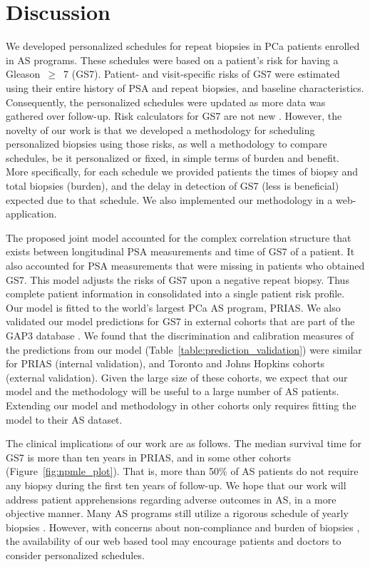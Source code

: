 \section{Discussion}
We developed personalized schedules for repeat biopsies in PCa patients enrolled in AS programs. These schedules were based on a patient's risk for having a Gleason~$\geq$~7 (GS7). Patient- and visit-specific risks of GS7 were estimated using their entire history of PSA and repeat biopsies, and baseline characteristics. Consequently, the personalized schedules were updated as more data was gathered over follow-up. Risk calculators for GS7 are not new \citep{coley2017prediction,ankerst2015precision}. However, the novelty of our work is that we developed a methodology for scheduling personalized biopsies using those risks, as well a methodology to compare schedules, be it personalized or fixed, in simple terms of burden and benefit. More specifically, for each schedule we provided patients the times of biopsy and total biopsies (burden), and the delay in detection of GS7 (less is beneficial) expected due to that schedule. We also implemented our methodology in a web-application.

The proposed joint model accounted for the complex correlation structure that exists between longitudinal PSA measurements and time of GS7 of a patient. It also accounted for PSA measurements that were missing in patients who obtained GS7. This model adjusts the risks of GS7 upon a negative repeat biopsy. Thus complete patient information in consolidated into a single patient risk profile. Our model is fitted to the world's largest PCa AS program, PRIAS. We also validated our model predictions for GS7 in external cohorts that are part of the GAP3 database \citep{gap3_2018}. We found that the discrimination and calibration measures of the predictions from our model (Table~\ref{table:prediction_validation}) were similar for PRIAS (internal validation), and Toronto and Johns Hopkins cohorts (external validation). Given the large size of these cohorts, we expect that our model and the methodology will be useful to a large number of AS patients. Extending our model and methodology in other cohorts only requires fitting the model to their AS dataset.

The clinical implications of our work are as follows. The median survival time for GS7 is more than ten years in PRIAS, and in some other cohorts (Figure~\ref{fig:npmle_plot}). That is, more than 50\% of AS patients do not require any biopsy during the first ten years of follow-up. We hope that our work will address patient apprehensions regarding adverse outcomes in AS, in a more objective manner. Many AS programs still utilize a rigorous schedule of yearly biopsies \citep{nieboer2018active}. However, with concerns about non-compliance and burden of biopsies \citep{bokhorst2015compliance}, the availability of our web based tool may encourage patients and doctors to consider personalized schedules.


